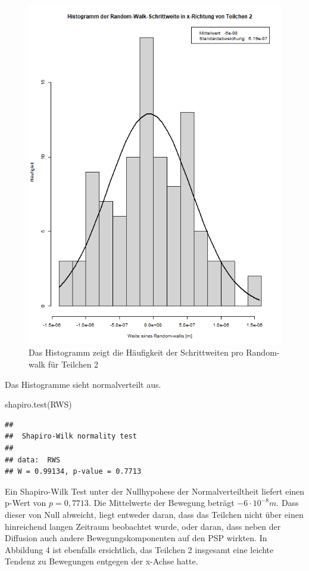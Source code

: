 \documentclass[
  9pt,
]{article}
\newenvironment{Shaded}{\begin{snugshade}}{\end{snugshade}}
\newcommand{\FunctionTok}[1]{\textcolor[rgb]{0.00,0.00,0.00}{#1}}
\newcommand{\NormalTok}[1]{#1}
\begin{document}
\begin{figure}
\centering
\includegraphics[width=\textwidth,height=0.31\textheight]{code/Plots/Teilchen2.png}
\caption{Das Histogramm zeigt die Häufigkeit der Schrittweiten pro
Random-walk für Teilchen 2}
\end{figure}

Das Histogramme sieht normalverteilt aus.

\begin{Shaded}
\begin{Highlighting}[]
\FunctionTok{shapiro.test}\NormalTok{(RWS)}
\end{Highlighting}
\end{Shaded}

\begin{verbatim}
## 
##  Shapiro-Wilk normality test
## 
## data:  RWS
## W = 0.99134, p-value = 0.7713
\end{verbatim}

Ein Shapiro-Wilk Test unter der Nullhypohese der Normalverteiltheit
liefert einen p-Wert von \(p = 0,7713\). Die Mittelwerte der Bewegung
beträgt \(-6\cdot10^{-8}m\). Dass dieser von Null abweicht, liegt
entweder daran, dass das Teilchen nicht über einen hinreichend langen
Zeitraum beobachtet wurde, oder daran, dass neben der Diffusion auch
andere Bewegungskomponenten auf den PSP wirkten. In Abbildung 4 ist
ebenfalls ersichtlich, das Teilchen 2 insgesamt eine leichte Tendenz zu
Bewegungen entgegen der x-Achse hatte.
\end{document}
